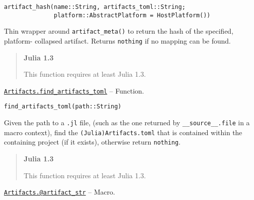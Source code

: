 \begin{adjustwidth}{2em}{0pt}


\begin{verbatim}
artifact_hash(name::String, artifacts_toml::String;
              platform::AbstractPlatform = HostPlatform())
\end{verbatim}

Thin wrapper around \texttt{artifact\_meta()} to return the hash of the specified, platform- collapsed artifact.  Returns \texttt{nothing} if no mapping can be found.

\begin{quote}
\textbf{Julia 1.3}

This function requires at least Julia 1.3.

\end{quote}


\end{adjustwidth}
\hypertarget{57806219275879543}{}
\hyperlink{57806219275879543}{\texttt{Artifacts.find\_artifacts\_toml}}  -- {Function.}

\begin{adjustwidth}{2em}{0pt}


\begin{verbatim}
find_artifacts_toml(path::String)
\end{verbatim}

Given the path to a \texttt{.jl} file, (such as the one returned by \texttt{\_\_source\_\_.file} in a macro context), find the \texttt{(Julia)Artifacts.toml} that is contained within the containing project (if it exists), otherwise return \texttt{nothing}.

\begin{quote}
\textbf{Julia 1.3}

This function requires at least Julia 1.3.

\end{quote}


\end{adjustwidth}
\hypertarget{1740904596345126740}{}
\hyperlink{1740904596345126740}{\texttt{Artifacts.@artifact\_str}}  -- {Macro.}

